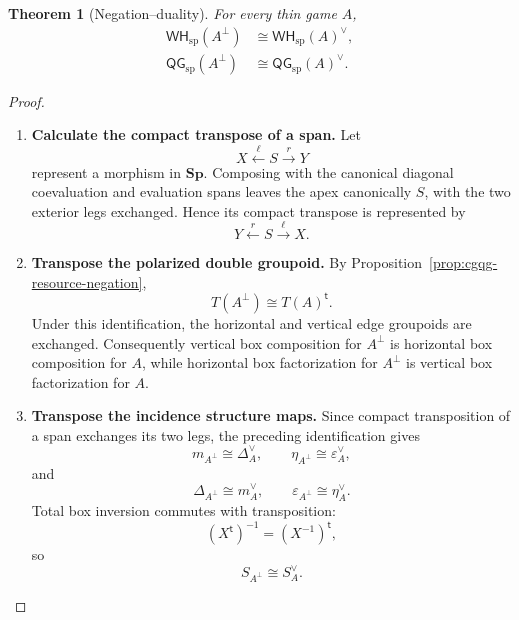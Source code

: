 \documentclass[oneside]{article}
\newcommand{\WH}{\mathsf{WH}}
\newcommand{\QG}{\mathsf{QG}}
\newcommand{\Sp}{\mathbf{Sp}}
\theoremstyle{plain}
\newtheorem{theorem}{Theorem}[section]
\theoremstyle{definition}
\theoremstyle{remark}
\begin{document}
\begin{theorem}[Negation--duality]
\label{thm:cgqg-qg-negation}
    For every thin game \(A\),
    \begin{align}
        \WH_{\mathrm{sp}}(A^\perp)
        &\cong
        \WH_{\mathrm{sp}}(A)^\vee,
        \label{eq:cgqg-span-negation-dual}\\
        \QG_{\mathrm{sp}}(A^\perp)
        &\cong
        \QG_{\mathrm{sp}}(A)^\vee.
        \label{eq:cgqg-span-qg-negation}
    \end{align}
\end{theorem}
\begin{proof}
    \leavevmode
    \begin{enumerate}[beginpenalty=10000]
        \item \textbf{Calculate the compact transpose of a span.}
        Let
        \[
            X\xleftarrow{\ell}S\xrightarrow{r}Y
        \]
        represent a morphism in \(\Sp\). Composing with the canonical
        diagonal coevaluation and evaluation spans leaves the apex
        canonically \(S\), with the two exterior legs exchanged.
        Hence its compact transpose is represented by
        \[
            Y\xleftarrow{r}S\xrightarrow{\ell}X.
        \]

        \item \textbf{Transpose the polarized double groupoid.}
        By Proposition~\ref{prop:cgqg-resource-negation},
        \[
            T(A^\perp)
            \cong
            T(A)^{\mathsf t}.
        \]
        Under this identification, the horizontal and vertical edge
        groupoids are exchanged. Consequently vertical box composition
        for \(A^\perp\) is horizontal box composition for \(A\), while
        horizontal box factorization for \(A^\perp\) is vertical box
        factorization for \(A\).

        \item \textbf{Transpose the incidence structure maps.}
        Since compact transposition of a span exchanges its two legs,
        the preceding identification gives
        \[
            m_{A^\perp}
            \cong
            \Delta_A^\vee,
            \qquad
            \eta_{A^\perp}
            \cong
            \varepsilon_A^\vee,
        \]
        and
        \[
            \Delta_{A^\perp}
            \cong
            m_A^\vee,
            \qquad
            \varepsilon_{A^\perp}
            \cong
            \eta_A^\vee.
        \]
        Total box inversion commutes with transposition:
        \[
            (X^{\mathsf t})^{-1}
            =
            (X^{-1})^{\mathsf t},
        \]
        so
        \[
            S_{A^\perp}
            \cong
            S_A^\vee.
        \]


\end{enumerate}
\end{proof}
\end{document}
